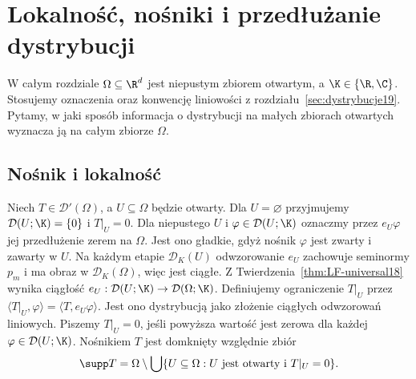 \section{Lokalność, nośniki i przedłużanie dystrybucji}
\providecommand{\atlasref}[2]{#2}

W całym rozdziale $\Omega\subseteq\R^d$ jest niepustym zbiorem
otwartym, a $\K\in\{\R,\C\}$. Stosujemy oznaczenia oraz
konwencję liniowości z rozdziału~\ref{sec:dystrybucje19}.
Pytamy, w jaki sposób informacja o dystrybucji na małych
zbiorach otwartych wyznacza ją na całym zbiorze $\Omega$.

\subsection{Nośnik i lokalność}

\begin{definicja}
\label{def:distribution-zero19}
Niech $T\in\mathcal D'(\Omega)$, a $U\subseteq\Omega$
będzie otwarty. Dla $U=\varnothing$ przyjmujemy
$\mathcal D(U;\K)=\{0\}$ i $T|_U=0$.
Dla niepustego $U$ i $\varphi\in\mathcal D(U;\K)$ oznaczmy przez
$e_U\varphi$ jej przedłużenie zerem na $\Omega$.
Jest ono gładkie, gdyż nośnik $\varphi$ jest zwarty
i zawarty w $U$. Na każdym etapie $\mathcal D_K(U)$
odwzorowanie $e_U$ zachowuje seminormy $p_m$ i ma obraz
w $\mathcal D_K(\Omega)$, więc jest ciągłe.
Z Twierdzenia~\ref{thm:LF-universal18} wynika ciągłość
$e_U:\mathcal D(U;\K)\to\mathcal D(\Omega;\K)$.
Definiujemy ograniczenie $T|_U$ przez
$\langle T|_U,\varphi\rangle=\langle T,e_U\varphi\rangle$.
Jest ono dystrybucją jako złożenie ciągłych odwzorowań liniowych.
Piszemy $T|_U=0$, jeśli powyższa wartość jest zerowa
dla każdej $\varphi\in\mathcal D(U;\K)$.
Nośnikiem $T$ jest domknięty względnie zbiór
\[\supp T=\Omega\setminus\bigcup\{U\subseteq\Omega:
U\text{ jest otwarty i }T|_U=0\}.\]
\end{definicja}

